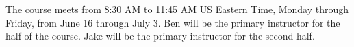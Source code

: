 The course meets from 8:30 AM to 11:45 AM US Eastern Time, Monday through Friday, from June 16
through July 3. Ben will be the primary instructor for the half of the
course. Jake will be the primary instructor for the second half.


